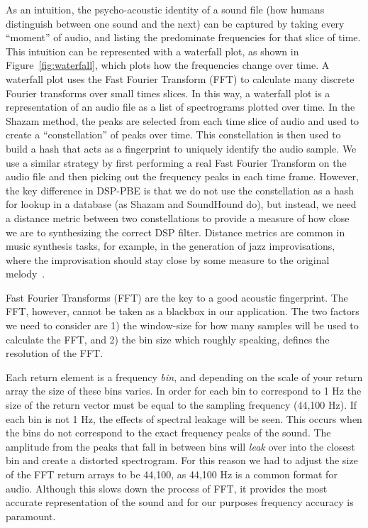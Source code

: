 As an intuition, the psycho-acoustic identity of a sound file (how humans distinguish between one sound and the next) can be captured by taking every ``moment'' of audio, and listing the predominate frequencies for that slice of time.
This intuition can be represented with a waterfall plot, as shown in Figure~\ref{fig:waterfall}, which plots how the frequencies change over time.
A waterfall plot uses the Fast Fourier Transform (FFT) to calculate many discrete Fourier transforms over small times slices.
In this way, a waterfall plot is a representation of an audio file as a list of spectrograms plotted over time.
In the Shazam method, the peaks are selected from each time slice of audio and used to create a ``constellation'' of peaks over time. 
This constellation is then used to build a hash that acts as a fingerprint to uniquely identify the audio sample.
We use a similar strategy by first performing a real Fast Fourier Transform on the audio file and then picking out the frequency peaks in each time frame.
However, the key difference in DSP-PBE is that we do not use the constellation as a hash for lookup in a database (as Shazam and SoundHound do), but instead, we need a distance metric between two constellations to provide a measure of how close we are to synthesizing the correct DSP filter.
Distance metrics are common in music synthesis tasks, for example, in the generation of jazz improvisations, where the improvisation should stay close by some measure to the original melody~\cite{donze2014machine}.

Fast Fourier Transforms (FFT) are the key to a good acoustic fingerprint.
The FFT, however, cannot be taken as a blackbox in our application.
The two factors we need to consider are 1) the window-size for how many samples will be used to calculate the FFT, and 2) the bin size which roughly speaking, defines the resolution of the FFT.

Each return element is a frequency \textit{bin}, and depending on the scale of your return array the size of these bins varies.
In order for each bin to correspond to 1 Hz the size of the return vector must be equal to the sampling frequency (44,100 Hz).
If each bin is not 1 Hz, the effects of spectral leakage will be seen.
This occurs when the bins do not correspond to the exact frequency peaks of the sound.
The amplitude from the peaks that fall in between bins will \textit{leak} over into the closest bin and create a distorted spectrogram.
For this reason we had to adjust the size of the FFT return arrays to be 44,100, as 44,100 Hz is a common format for audio.
Although this slows down the process of FFT, it provides the most accurate representation of the sound and for our purposes frequency accuracy is paramount.


